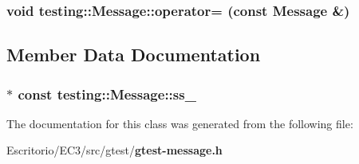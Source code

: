 \subsubsection{\setlength{\rightskip}{0pt plus 5cm}void testing::Message::operator= (const {\bf Message} \&)\hspace{0.3cm}{\tt  [private]}}\label{classtesting_1_1Message_3f7cad27f17733b0797950b80810de0c}




\subsection{Member Data Documentation}
\subsubsection{$\ast$ const {\bf testing::Message::ss\_\-}\hspace{0.3cm}{\tt  [private]}}\label{classtesting_1_1Message_7e03bff5728112914f4c1abba631d25a}




The documentation for this class was generated from the following file:\begin{CompactItemize}
\item 
Escritorio/EC3/src/gtest/{\bf gtest-message.h}\end{CompactItemize}
